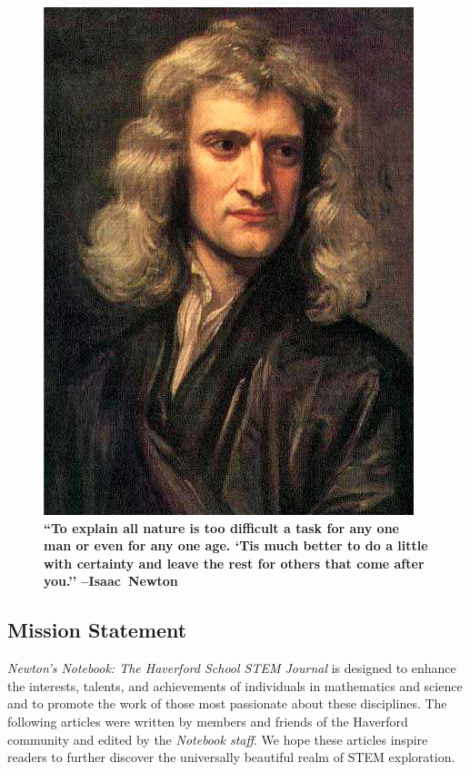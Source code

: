 \documentclass[12pt]{article}
\begin{document}
\setcounter{tocdepth}{1}


\begin{figure}[H]
    \centering \includegraphics[scale=1]{newton.jpg}
    \\
    \textbf{\large{``To explain all nature is too difficult a task for any one man or even for any one age. `Tis much better to do a little with certainty and leave the rest for others that come after you.'' --Isaac~Newton}}
\end{figure}


\begin{spacing}{1.0}
\tableofcontents
\end{spacing}

\newpage
\subsection*{Mission Statement}
\textit{Newton’s Notebook: The Haverford School STEM Journal} is designed to enhance the interests, talents, and achievements of individuals in mathematics and science and to promote the work of those most passionate about these disciplines. The following articles were written by members and friends of the Haverford community and edited by the \textit{Notebook staff}. We hope these articles inspire readers to further discover the universally beautiful realm of STEM exploration. 
\end{document}
